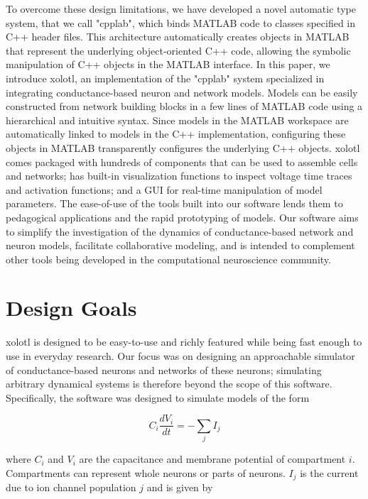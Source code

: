 \documentclass{frontiersSCNS} %
\begin{document}
To overcome these design limitations, we have developed a novel automatic type system, that we call "cpplab", which binds MATLAB code to classes specified in C++ header files. This architecture automatically creates objects in MATLAB that represent the underlying object-oriented C++ code, allowing the symbolic manipulation of C++ objects in the MATLAB interface. In this paper, we introduce xolotl, an implementation of the "cpplab" system specialized in integrating conductance-based neuron and network models. Models can be easily constructed from network building blocks in a few lines of MATLAB code using a hierarchical and intuitive syntax. Since models in the MATLAB workspace are automatically linked to models in the C++ implementation, configuring these objects in MATLAB transparently configures the underlying C++ objects. xolotl comes packaged with hundreds of components that can be used to assemble cells and networks;  has built-in visualization functions to inspect voltage time traces and activation functions; and a GUI for real-time manipulation of model parameters. The ease-of-use of the tools built into our software lends them to pedagogical applications and the rapid prototyping of models. Our software aims to simplify the investigation of the dynamics of conductance-based network and neuron models, facilitate collaborative modeling, and is intended to complement other tools being developed in the computational neuroscience community.


%
%
%
%
%
%

\section{Design Goals}
\label{design}

xolotl is designed to be easy-to-use and richly featured while being fast enough to use in everyday research. Our focus was on designing an approachable simulator of conductance-based neurons and networks of these neurons; simulating arbitrary dynamical systems is therefore beyond the scope of this software. Specifically, the software was designed to simulate models of the form


\begin{equation}
C_{i}\frac{dV_{i}}{dt}=-\sum_{j}I_{j} \label{eq:1}
\end{equation}

where \( C_{i} \) and  \( V_{i} \) are the capacitance and membrane potential of compartment  \( i \). Compartments can represent whole neurons or parts of neurons.  \( I_{j} \) is the current due to ion channel population \( j \) and is given by
\end{document}
